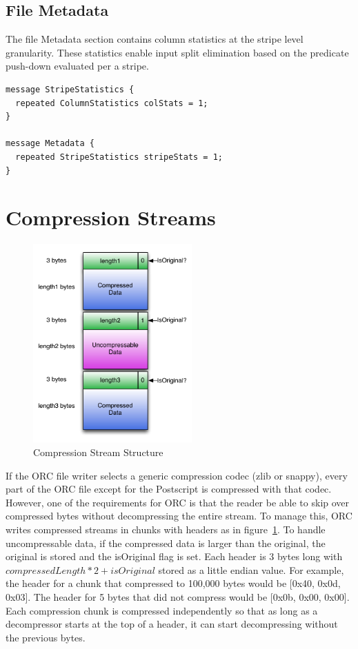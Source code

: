 \documentclass{article}
\begin{document}
\subsection{File Metadata}

The file Metadata section contains column statistics at the stripe
level granularity. These statistics enable input split elimination
based on the predicate push-down evaluated per a stripe.

\begin{verbatim}
message StripeStatistics {
  repeated ColumnStatistics colStats = 1;
}

message Metadata {
  repeated StripeStatistics stripeStats = 1;
}
\end{verbatim}

\section{Compression Streams}

\begin{figure}
  \centering
  \includegraphics[width=2.4in]{CompressionStream.pdf}
  \caption{Compression Stream Structure}
  \label{compression-stream}
  \vspace{-40pt}
\end{figure}

If the ORC file writer selects a generic compression codec (zlib or
snappy), every part of the ORC file except for the Postscript is
compressed with that codec.  However, one of the requirements for ORC
is that the reader be able to skip over compressed bytes without
decompressing the entire stream. To manage this, ORC writes compressed
streams in chunks with headers as in figure~\ref{compression-stream}.
To handle uncompressable data, if the compressed data is larger than
the original, the original is stored and the isOriginal flag is
set. Each header is 3 bytes long with $ compressedLength * 2 +
isOriginal $ stored as a little endian value. For example, the header
for a chunk that compressed to 100,000 bytes would be [0x40, 0x0d,
0x03]. The header for 5 bytes that did not compress would be [0x0b,
0x00, 0x00]. Each compression chunk is compressed independently so
that as long as a decompressor starts at the top of a header, it can
start decompressing without the previous bytes.
\end{document}
